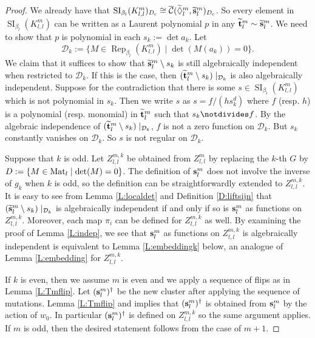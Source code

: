 \documentclass{amsart}
\theoremstyle{definition}
\theoremstyle{remark}
\numberwithin{equation}{section}
\DeclareMathOperator{\Rep}{Rep}
\DeclareMathOperator{\SI}{SI}
\newcommand{\mc}[1]{\mathcal{#1}}
\renewcommand{\b}[1]{\bold{#1}}
\newcommand{\br}[1]{\overline{#1}}
\newcommand{\wtd}[1]{\widetilde{#1}}
\newcommand{\uca}{\br{\mc{C}}}
\newcommand{\kllm}{{K_{l,l}^m}}
\newcommand{\bl}{{\beta_l}}
\begin{document}
\begin{proof} 	We already have that $\SI_\bl(\kllm)_{D_{\rm c}}\cong \uca(\wtd{\Diamond}_l^m,\wtd{\b{s}}_l^m)_{D_{\rm c}}$.
	So every element in $\SI_\bl(\kllm)$ can be written as a Laurent polynomial $p$ in any $\wtd{\b{t}}_l^m\sim \wtd{\b{s}}_l^m$.
	We need to show that $p$ is polynomial in each $s_k:=\det a_k$. Let 
	$$\mc{D}_k := \{M\in \Rep_\bl(\kllm) \mid \det(M(a_k))=0 \}.$$
	We claim that it suffices to show that $\wtd{\b{s}}_l^m\setminus s_k$ is still algebraically independent when restricted to $\mc{D}_k$.
	If this is the case, then $(\wtd{\b{t}}_l^m\setminus s_k)\mid_{\mc{D}_k}$ is also algebraically independent.
	Suppose for the contradiction that there is some $s\in \SI_\bl(\kllm)$ which is not polynomial in $s_k$.
	Then we write $s$ as $s=f/(hs_k^d)$ where $f$ (resp. $h$) is a polynomial (resp. monomial) in $\wtd{\b{t}}_l^m$ such that $s_k \notdivides f$.
	By the algebraic independence of $(\wtd{\b{t}}_l^m\setminus s_k)\mid_{\mc{D}_k}$, $f$ is not a zero function on $\mc{D}_k$.
	But $s_k$ constantly vanishes on $\mc{D}_k$. So $s$ is not regular on $\mc{D}_k$.
	
	Suppose that $k$ is odd.
	Let $Z_{l,l}^{m,k}$ be obtained from $Z_{l,l}^{m}$ by replacing the $k$-th $G$ by $D:=\{M\in {\rm Mat}_l \mid \det(M)=0\}$.
	The definition of $\b{s}_l^m$ does not involve the inverse of $g_k$ when $k$ is odd, so the definition can be straightforwardly extended to $Z_{l,l}^{m,k}$.
	It is easy to see from Lemma \ref{L:localdet} and Definition \ref{D:liftsijn} that $(\wtd{\b{s}}_l^m\setminus s_k)\mid_{\mc{D}_k}$ is algebraically independent if and only if so is $\b{s}_l^m$ as functions on $Z_{l,l}^{m,k}$.
    Moreover, each map $\pi_i$ can be defined for $Z_{l,l}^{m,k}$ as well.
	By examining the proof of Lemma \ref{L:indep}, we see that $\b{s}_l^m$ as functions on $Z_{l,l}^{m,k}$ is algebraically independent is equivalent to Lemma \ref{L:embeddingk} below, an analogue of Lemma \ref{L:embedding} for $Z_{l,l}^{m,k}$.

    If $k$ is even, then we assume $m$ is even and we apply a sequence of flips as in Lemma \ref{L:Tmflip}.
    Let $(\b{s}_l^m)^\dagger$ be the new cluster after applying the sequence of mutations.
    Lemma \ref{L:Tmflip} and \cite[Lemma 4.14]{FW} implies that $(\b{s}_l^m)^\dagger$ is obtained from $\b{s}_l^m$ by the action of $w_0$.
    In particular $(\b{s}_l^m)^\dagger$ is defined on $Z_{l,l}^{m,k}$ so the same argument applies.
    If $m$ is odd, then the desired statement follows from the case of $m+1$.
\end{proof}
\end{document}
